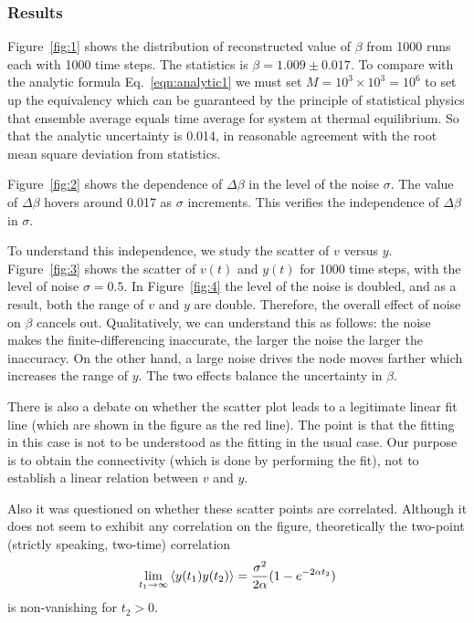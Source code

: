 \documentclass[11pt,a4paper]{article}
\begin{document}
\subsubsection{Results}
Figure~\ref{fig:1} shows the distribution of reconstructed value of $\beta$ from 1000 runs each with 1000 time steps. The statistics is $\beta=1.009\pm0.017$. To compare with the analytic formula Eq.~\ref{eqn:analytic1} we must set $M= 10^3\times10^3 = 10^6$ to set up the equivalency which can be guaranteed by the principle of statistical physics that ensemble average equals time average for system at thermal equilibrium. So that the analytic uncertainty is 0.014, in reasonable agreement with the root mean square deviation from statistics.

Figure~\ref{fig:2} shows the dependence of $\Delta \beta$ in the level of the noise $\sigma$. The value of $\Delta\beta$ hovers around 0.017 as $\sigma$ increments. This verifies the independence of $\Delta\beta$ in $\sigma$.

To understand this independence, we study the scatter of $v$ versus $y$. Figure~\ref{fig:3} shows the scatter of $v(t)$ and $y(t)$ for 1000 time steps, with the level of noise $\sigma=0.5$. In Figure~\ref{fig:4} the level of the noise is doubled, and as a result, both the range of $v$ and $y$ are double. Therefore, the overall effect of noise on $\beta$ cancels out. Qualitatively, we can understand this as follows: the noise makes the finite-differencing inaccurate, the larger the noise the larger the inaccuracy. On the other hand, a large noise drives the node moves farther which increases the range of $y$. The two effects balance the uncertainty in $\beta$.

There is also a debate on whether the scatter plot leads to a legitimate linear fit line (which are shown in the figure as the red line). The point is that the fitting in this case is not to be understood as the fitting in the usual case. Our purpose is to obtain the connectivity (which is done by performing the fit), not to establish a linear relation between $v$ and $y$. 

Also it was questioned on whether these scatter points are correlated. Although it does not seem to exhibit any correlation on the figure, theoretically the two-point (strictly speaking, two-time) correlation
\begin{equation}
    \lim_{t_1\rightarrow\infty}\expval{y(t_1)y(t_2)} = \frac{\sigma^2}{2\alpha} (1-e^{-2\alpha t_2})
\end{equation}
is non-vanishing for $t_2>0$. 
\end{document}
